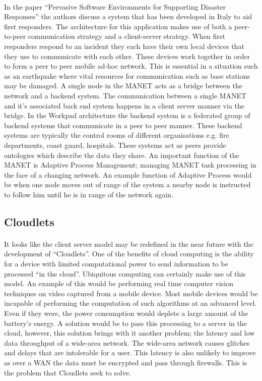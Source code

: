 \documentclass[11pt]{amsart}
\begin{document}
\paragraph{}
In the paper ``Pervasive Software Environments for Supporting Disaster Responses'' the authors discuss a system that has been developed in Italy to aid first responders. The architecture for this application makes use of both a peer-to-peer communication strategy and a client-server strategy. When first responders respond to an incident they each have their own local devices that they use to communicate with each other. These devices work together in order to form a peer to peer mobile ad-hoc network. This is essential in a situation such as an earthquake where vital resources for communication such as base stations may be damaged. A single node in the MANET acts as a bridge between the network and a backend system. The communication between a single MANET and it's associated back end system happens in a client server manner via the bridge. In the Workpad architecture the backend system is a federated group of backend systems that communicate in a peer to peer manner. These backend systems are typically the control rooms of different organisations e.g. fire departments, coast guard, hospitals. These systems act as peers provide ontologies which describe the data they share. An important function of the MANET is Adaptive Process Management; managing MANET task processing in the face of a changing network. An example function of Adaptive Process would be when one node moves out of range of the system a nearby node is instructed to follow him until he is in range of the network again.
\paragraph{}
\subsection{Cloudlets}\cite{satyanarayanan2009case}
\paragraph{}
It looks like the client server model may be redefined in the near future with the development of ``Cloudlets''. One of the benefits of cloud computing is the ability for a device with limited computational power to send information to be processed  ``in the cloud''. Ubiquitous computing can certainly make use of this model. An example of this would be performing real time computer vision techniques on video captured from a mobile device. Most mobile devices would be incapable of performing the computation of such algorithms at an advanced level. Even if they were, the power consumption would deplete a large amount of the battery's energy. A solution would be to pass this processing to a server in the cloud, however, this solution brings with it another problem; the latency and low data throughput of a wide-area network. The wide-area network causes glitches and delays that are intolerable for a user. This latency is also unlikely to improve as over a WAN the data must be encrypted and pass through firewalls. This is the problem that Cloudlets seek to solve. 
\end{document}
